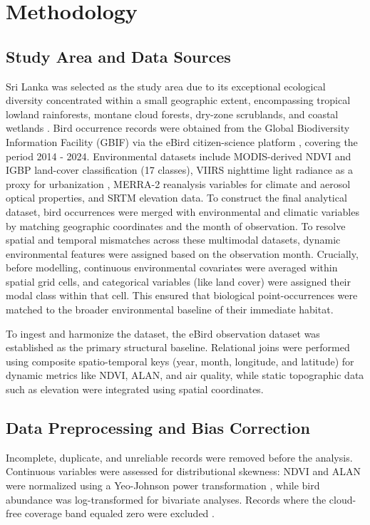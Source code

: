 \documentclass[conference]{IEEEtran}
\begin{document}
\section{Methodology}

\subsection{Study Area and Data Sources}

Sri Lanka was selected as the study area due to its exceptional ecological diversity concentrated within a small geographic extent, encompassing tropical lowland rainforests, montane cloud forests, dry-zone scrublands, and coastal wetlands \cite{ref1}. Bird occurrence records were obtained from the Global Biodiversity Information Facility (GBIF) via the eBird citizen-science platform \cite{ref9}, covering the period 2014 - 2024. Environmental datasets include MODIS-derived NDVI and IGBP land-cover classification (17 classes), VIIRS nighttime light radiance as a proxy for urbanization \cite{ref11}, MERRA-2 reanalysis variables for climate and aerosol optical properties, and SRTM elevation data. To construct the final analytical dataset, bird occurrences were merged with environmental and climatic variables by matching geographic coordinates and the month of observation. 
To resolve spatial and temporal mismatches across these multimodal datasets, dynamic environmental features were assigned based on the observation month. Crucially, before modelling, continuous environmental covariates were averaged within spatial grid cells, and categorical variables (like land cover) were assigned their modal class within that cell. This ensured that biological point-occurrences were matched to the broader environmental baseline of their immediate habitat.

To ingest and harmonize the dataset, the eBird observation dataset was established as the primary structural baseline. Relational joins were performed using composite spatio-temporal keys (year, month, longitude, and latitude) for dynamic metrics like NDVI, ALAN, and air quality, while static topographic data such as elevation were integrated using spatial coordinates. 

\subsection{Data Preprocessing and Bias Correction}

Incomplete, duplicate, and unreliable records were removed before the analysis. Continuous variables were assessed for distributional skewness: NDVI and ALAN were normalized using a Yeo-Johnson power transformation \cite{ref22}, while bird abundance was log-transformed for bivariate analyses. Records where the cloud-free coverage band equaled zero were excluded \cite{ref3}. 
\end{document}
